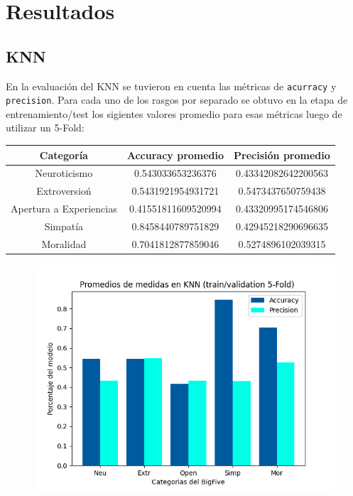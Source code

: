 \documentclass[10pt, a4paper]{article}
\begin{document}
    \section{Resultados}
            \subsection{KNN}
                En la evaluaci\'on del KNN se tuvieron en cuenta las m\'etricas de \texttt{acurracy} y \texttt{precision}. Para cada uno de los rasgos por separado se
                obtuvo en la etapa de entrenamiento/test los sigientes valores promedio para esas m\'etricas luego de utilizar un 5-Fold: \\

                \begin{tabular}[h!]{|c|c|c|}

                    \hline Categor\'ia & Accuracy promedio & Precisi\'on promedio \\  
                    \hline Neuroticismo & 0.543033653236376 & 0.43342082642200563 \\
                    \hline Extroversio\'n& 0.5431921954931721 & 0.5473437650759438 \\
                    \hline Apertura a Experiencias & 0.41551811609520994 & 0.43320995174546806 \\
                    \hline Simpat\'ia& 0.8458440789751829 & 0.42945218290696635 \\
                    \hline Moralidad & 0.7041812877859046 & 0.5274896102039315 \\
                    \hline
                \end{tabular}

                \begin{figure}[h!]
                    \centering
                    \includegraphics[width = 0.7\linewidth]{bar_knn.png}
                \end{figure}
\end{document}
